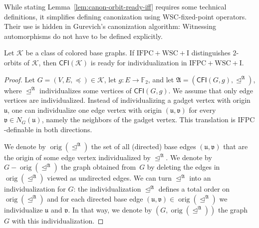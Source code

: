 \documentclass[]{lmcs}
\newcommand{\FF}{\mathbb{F}}
\newcommand{\Struct}{\mathfrak{A}}
\newcommand{\spleq}{\preceq}
\newcommand{\GraphClass}{\mathcal{K}}
\newcommand{\neighbors}[2]{N_{#1}(#2)}
\newcommand{\IFPC}{\ensuremath{\mathrm{IFPC}}}
\newcommand{\IFPCWSCI}{\ensuremath{\mathrm{IFPC{+}WSC{+}I}}}
\newcommand{\CFIsym}{\mathsf{CFI}}
\newcommand{\CFI}[1]{\CFIsym(#1)}
\newcommand{\orig}[1]{\operatorname{orig}(#1)}
\newcommand{\bVertA}{\mathfrak{u}}
\newcommand{\bVertB}{\mathfrak{v}}
\newcommand{\indRel}{\trianglelefteq}
\begin{document}
While stating Lemma~\ref{lem:canon-orbit-ready-iff}
requires some technical definitions,
it simplifies defining canonization using WSC-fixed-point operators.
Their use is hidden in Gurevich's canonization algorithm:
Witnessing automorphisms do not have to be defined explicitly.


\begin{lem}
	\label{lem:CFI ready-individualization}
	Let $\GraphClass$ be a class of colored base graphs.
	\hspace{-0.5pt}If \IFPCWSCI{} distinguishes $2$-orbits of $\GraphClass$,
	then $\CFI{\GraphClass}$ is ready for individualization in \IFPCWSCI{}.
\end{lem}
\begin{proof}
	Let $G=(V,E,\spleq) \in \GraphClass$,
	let $g\colon E \to \FF_2$,
	and let $\Struct = (\CFI{G,g}, \indRel^\Struct)$,
	where $\indRel^\Struct$ individualizes some vertices of
	$\CFI{G,g}$.
	We assume that only edge vertices are individualized.
	Instead of individualizing a gadget vertex with origin $\bVertA$,
	one can individualize one edge vertex
	with origin $(\bVertA, \bVertB)$ for every $\bVertB \in \neighbors{G}{\bVertA}$, namely the neighbors of the gadget vertex.
	This translation  is \IFPC{}-definable in both directions.
	
	We denote by $\orig{\indRel^\Struct}$
	the set of all (directed) base edges $(\bVertA,\bVertB)$
	that are the origin of some edge vertex individualized by $\indRel^\Struct$.
	We denote by $G-\orig{\indRel^\Struct}$
	the graph obtained from~$G$ by deleting
	the edges in $\orig{\indRel^\Struct}$ viewed as undirected edges.
	We can turn $\indRel^\Struct$ into an individualization for $G$:
	the individualization $\indRel^\Struct$ defines a total order on $\orig{\indRel^\Struct}$ 
	and for each directed base edge $(\bVertA,\bVertB) \in \orig{\indRel^\Struct}$ we individualize $\bVertA$ and $\bVertB$.
	In that way, we denote by $(G, \orig{\indRel^\Struct})$
	the graph~$G$ with this individualization.
	

\end{proof}
\end{document}
